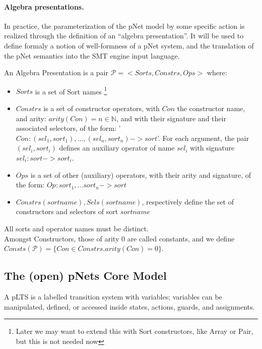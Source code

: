 \documentclass{lncs/llncs}
\begin{document}
\paragraph*{Algebra presentations.}
In practice, the parameterization of the pNet model by some specific
action is realized through the definition of an ``algebra
presentation''. It will be used to define formaly a notion of
well-formness of a pNet system, and the translation of the pNet
semantics into the SMT engine input language.

\begin{definition}
  An Algebra Presentation is a pair $\mathcal{P}=<Sorts,Constrs,Ops>$ where:
  \begin{itemize}
  \item $Sorts$ is a set of Sort names
    \footnote{Later we may want to extend this with Sort constructors,
      like Array or Pair, but this is not needed now}
  \item $Constrs$ is a set of constructor operators, with $Con$ the
    constructor name, and arity: $arity(Con)=n \in \mathbb{N}$,
    and with their signature and their associated selectors,
    of the form: '$Con : (sel_1,sort_1), ... , (sel_n,sort_n) -> sort$'.
    For each argument, the pair $(sel_i,sort_i)$ defines an auxiliary
    operator of name $sel_i$ with signature $sel_i : sort -> sort_i$.
    \item $Ops$ is a set of other (auxiliary) operators, with their
      arity and signature, of the form: $Op : sort_1, ...  sort_n ->
      sort$
      \item $Constrs(sortname), Sels(sortname)$, respectively define the set of
        constructors and selectors of sort $sortname$
  \end{itemize}
  All sorts and operator names must be distinct.\\
  Amongst Constructors, those of arity 0 are called constants, and we
  define $Consts(\mathcal{P}) = \{Con \in Constrs. arity(Con)=0\}$.
\end{definition}

\subsection{The (open) pNets Core Model}
\label{section:pNets}


A pLTS is a labelled transition system with variables; variables can be
manipulated, defined, or accessed inside states, actions, guards, and
assignments. 

\end{document}
